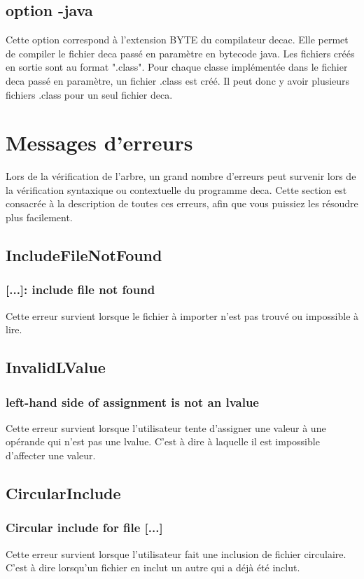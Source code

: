 \documentclass[12pt, a4paper, one side]{article}
\begin{document}
\subsection{option -java}

Cette option correspond à l'extension BYTE du compilateur decac. Elle permet de compiler le fichier deca passé en paramètre en bytecode java. Les fichiers créés en sortie sont au format ".class". Pour chaque classe implémentée dans le fichier deca passé en paramètre, un fichier .class est créé. Il peut donc y avoir plusieurs fichiers .class pour un seul fichier deca.

\section{Messages d'erreurs}

Lors de la vérification de l'arbre, un grand nombre d'erreurs peut survenir lors de la vérification syntaxique ou
contextuelle du programme deca. Cette section est consacrée à la description de toutes ces erreurs,
afin que vous puissiez les résoudre plus facilement.

\subsection{IncludeFileNotFound}
\subsubsection{[...]: include file not found}
Cette erreur survient lorsque le fichier à importer n'est pas trouvé ou impossible à lire.


\subsection{InvalidLValue}
\subsubsection{left-hand side of assignment is not an lvalue}
Cette erreur survient lorsque l'utilisateur tente d'assigner une valeur à une opérande qui n'est pas une lvalue. C'est à dire à laquelle il est impossible d'affecter une valeur.


\subsection{CircularInclude}
\subsubsection{Circular include for file [...]}
Cette erreur survient lorsque l'utilisateur fait une inclusion de fichier circulaire. C'est à dire lorsqu'un fichier en inclut un autre qui a déjà été inclut.
\end{document}
